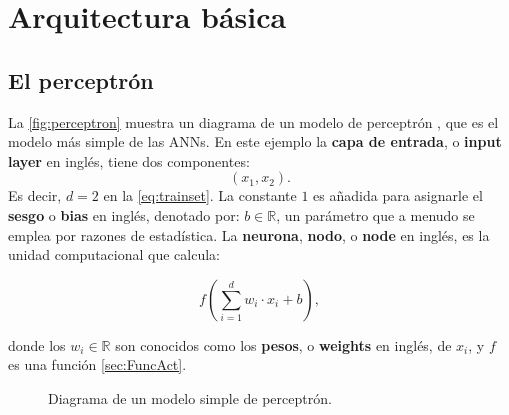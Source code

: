 \section{Arquitectura básica}

\subsection{El perceptrón}\label{sec:perceptron}

La \autoref{fig:perceptron} muestra un diagrama de un modelo de perceptrón \cite{Rosenblatt1958ThePA}, que es el modelo más simple de las \acs{ANN}s. En este ejemplo la \textbf{capa de entrada}, o \textbf{input layer} en inglés, tiene dos componentes:
$$(x_1,x_2).$$
Es decir, $d=2$ en la \autoref{eq:trainset}. La constante $1$ es añadida para asignarle el \textbf{sesgo} o \textbf{bias} en inglés, denotado por: $b \in \mathbb{R}$, un parámetro que a menudo se emplea por razones de estadística. La \textbf{neurona}, \textbf{nodo}, o \textbf{node} en inglés, es la unidad computacional que calcula:

\begin{equation}
  \label{eq:neuronfun}
  f\left( \sum_{i=1}^dw_i\cdot x_i + b \right),
\end{equation}

\noindent donde los $w_i \in \mathbb{R}$ son conocidos como los \textbf{pesos}, o \textbf{weights} en inglés, de $x_i$, y $f$ es una función \autoref{sec:FuncAct}.
\begin{figure}[hb]
  \centering

\caption{Diagrama de un modelo simple de perceptrón.}
\label{fig:perceptron}
\end{figure}

